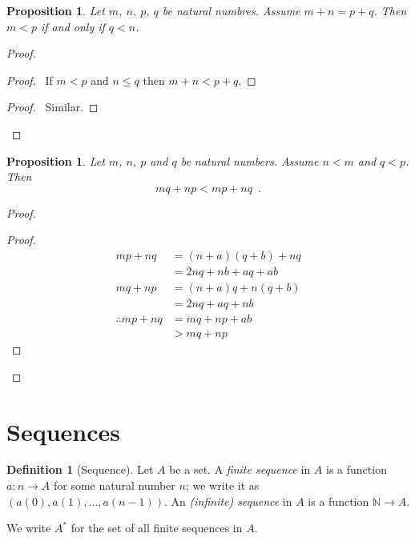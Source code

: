 \documentclass{book}
\let\qed\relax
\newtheorem{prop}[ax]{Proposition}
\theoremstyle{definition}
\newtheorem{df}[ax]{Definition}
\begin{document}
\begin{prop}
\label{prop:intltlemma}
Let $m$, $n$, $p$, $q$ be natural numbres. Assume $m + n = p + q$. Then $m < p$ if and only if $q < n$.
\end{prop}

\begin{proof}
\pf
{}
\begin{proof}
	\pf\ If $m < p$ and $n \leq q$ then $m+n < p + q$.
\end{proof}
\begin{proof}
	\pf\ Similar.
\end{proof}
\qed
\end{proof}

\begin{prop}
\label{prop:intmultlemma}
Let $m$, $n$, $p$ and $q$ be natural numbers. Assume $n < m$ and $q < p$. Then
\[ mq + np < mp + nq \enspace . \]
\end{prop}

\begin{proof}
\pf
{}
\begin{proof}
	\pf
	\begin{align*}
		mp + nq & = (n+a) (q + b) + nq \\
		& = 2nq + nb + aq + ab \\
		mq + np & = (n + a) q + n (q + b) \\
		& = 2nq + aq + nb \\
		\therefore mp + nq & = mq + np + ab \\
		& > mq + np
	\end{align*}
\end{proof}
\qed
\end{proof}

\section{Sequences}

\begin{df}[Sequence]
Let $A$ be a set. A \emph{finite sequence} in $A$ is a function $a : n \rightarrow A$ for some natural number $n$; we write it as $(a(0), a(1), \ldots, a(n-1))$. An \emph{(infinite) sequence} in $A$ is a function $\mathbb{N} \rightarrow A$.

We write $A^*$ for the set of all finite sequences in $A$.
\end{df}
\end{document}

